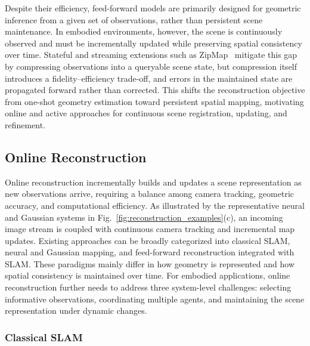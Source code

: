 \documentclass{SCIS2026}
\begin{document}
Despite their efficiency, feed-forward models are primarily designed for geometric inference from a given set of observations, rather than persistent scene maintenance. In embodied environments, however, the scene is continuously observed and must be incrementally updated while preserving spatial consistency over time. Stateful and streaming extensions such as ZipMap~\cite{jin2026zipmap} mitigate this gap by compressing observations into a queryable scene state, but compression itself introduces a fidelity--efficiency trade-off, and errors in the maintained state are propagated forward rather than corrected. This shifts the reconstruction objective from one-shot geometry estimation toward persistent spatial mapping, motivating online and active approaches for continuous scene registration, updating, and refinement.

\subsection{Online Reconstruction}

Online reconstruction incrementally builds and updates a scene representation as new observations arrive, requiring a balance among camera tracking, geometric accuracy, and computational efficiency. As illustrated by the representative neural and Gaussian systems in Fig.~\ref{fig:reconstruction_examples}(c), an incoming image stream is coupled with continuous camera tracking and incremental map updates. Existing approaches can be broadly categorized into classical SLAM, neural and Gaussian mapping, and feed-forward reconstruction integrated with SLAM. These paradigms mainly differ in how geometry is represented and how spatial consistency is maintained over time. For embodied applications, online reconstruction further needs to address three system-level challenges: selecting informative observations, coordinating multiple agents, and maintaining the scene representation under dynamic changes.

\subsubsection{Classical SLAM}
\end{document}
